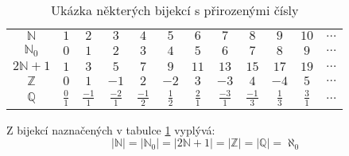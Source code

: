 \begin{table}[h]
    \centering
    \begin{tabular}{cccccccccccc}
    $\mathbb{N}$   & $1$ & $2$ & $3$  & $4$ & $5$  & $6$  & $7$  & $8$  & $9$  & $10$ & $\dots$ \\
    $\mathbb{N}_0$ & $0$ & $1$ & $2$  & $3$ & $4$  & $5$  & $6$  & $7$  & $8$  & $9$  & $\dots$ \\
    $2\mathbb{N}+1$   & $1$ & $3$ & $5$  & $7$ & $9$  & $11$ & $13$ & $15$ & $17$ & $19$ & $\dots$ \\
    $\mathbb{Z}$  & $0$ & $1$ & $-1$ & $2$ & $-2$ & $3$  & $-3$ & $4$  & $-4$ & $5$  & $\dots$ \\
    $\mathbb{Q}$ &
      $\frac{0}{1}$ &
      $\frac{-1}{1}$ &
      $\frac{-2}{1}$ &
      $\frac{-1}{2}$ &
      $\frac{1}{2}$ &
      $\frac{2}{1}$ &
      $\frac{-3}{1}$ &
      $\frac{-1}{3}$ &
      $\frac{1}{3}$ &
      $\frac{3}{1}$ &
      $\dots$
    \end{tabular}
    \caption{Ukázka některých bijekcí s přirozenými čísly}
    \label{tab:Naturlas_bijection}
\end{table}

Z bijekcí naznačených v tabulce \ref{tab:Naturlas_bijection} vyplývá:
$$|\mathbb{N}| = |\mathbb{N}_0| = |2\mathbb{N}+1| = |\mathbb{Z}| = |\mathbb{Q}| = \aleph_0$$


